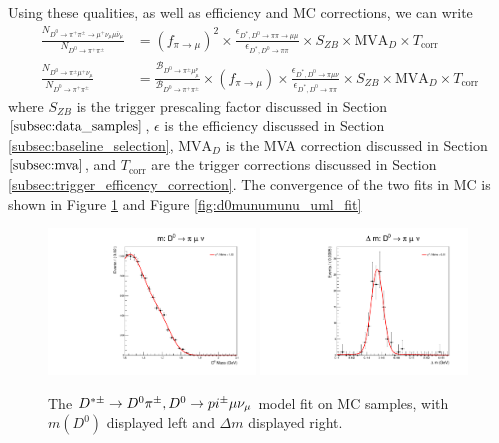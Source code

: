 Using these qualities, as well as efficiency and MC corrections, we can write
\begin{equation}
\begin{split}
    \frac{N_{D^0 \to \pi^+ \pi^\pm \to \mu^+ \nu_\mu \mu \bar{\nu}_\mu}}{N_{D^0 \to \pi^+ \pi^\pm}} &= \left(f_{\pi \to \mu}\right)^2 \times \frac{\epsilon_{D^*, D^0\to\pi\pi\to\mu\mu}}{\epsilon_{D^*, D^0\to\pi\pi}} \times S_{ZB} \times \text{MVA}_D \times T_{\text{corr}} \\
    \frac{N_{D^0 \to \pi^\pm \mu^+ \nu_\mu}}{N_{D^0 \to \pi^+ \pi^\pm}} &=\frac{\mathcal{B}_{D^0 \to \pi^\pm \mu^ \nu_\mu}}{\mathcal{B}_{D^0 \to \pi^+ \pi^\pm}} \times \left(f_{\pi \to \mu}\right) \times \frac{\epsilon_{D^*, D^0\to\pi\mu\nu}}{\epsilon_{D^*, D^0\to\pi\pi}} \times S_{ZB} \times \text{MVA}_D \times T_{\text{corr}}
    \label{eq:peaking_background_yield_calculation}
\end{split}
\end{equation}
where $S_{ZB}$ is the trigger prescaling factor discussed in Section $\ref{subsec:data_samples}$, $\epsilon$ is the efficiency discussed in Section \ref{subsec:baseline_selection}, $\text{MVA}_D$ is the MVA correction discussed in Section $\ref{subsec:mva}$, and $T_{\text{corr}}$ are the trigger corrections discussed in Section \ref{subsec:trigger_efficency_correction}. The convergence of the two fits in MC is shown in Figure \ref{fig:d0pimunu_uml_fit} and Figure \ref{fig:d0munumunu_uml_fit}

\begin{figure}[htp]
    \begin{center}
      \includegraphics[width=0.49\textwidth]{figures/chapter4/signal_fit/d0pimunu_2022_2023_0_m.pdf}
      \includegraphics[width=0.49\textwidth]{figures/chapter4/signal_fit/d0pimunu_2022_2023_0_dm.pdf}\\
    \end{center}
    \caption{
      The $D^{*\pm} \to D^0\pi^\pm, D^0 \to \\pi^\pm \mu \nu_\mu$ model fit on MC samples, with $m(D^0)$ displayed left and $\Delta m$ displayed right.
    }
    \label{fig:d0pimunu_uml_fit}
\end{figure}

